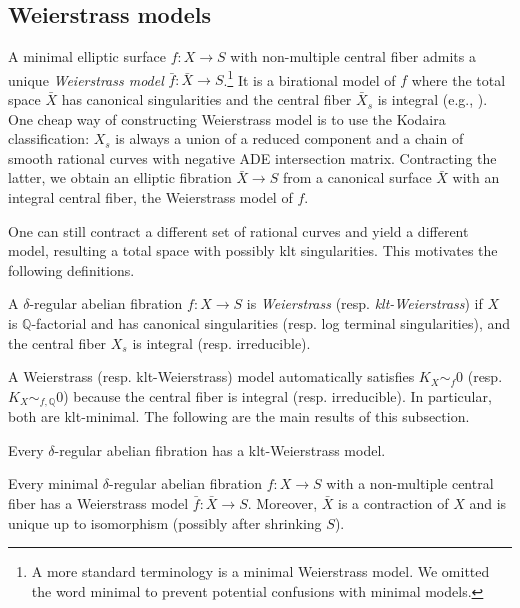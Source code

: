 \documentclass[reqno, letterpaper]{amsart}
\numberwithin{equation}{subsection}
\let\to\longrightarrow
\newcommand{\QQ}{\mathbb{Q}}
\begin{document}
		
		
	\subsection{Weierstrass models} \label{sec:Weierstrass models}
		A minimal elliptic surface $f : X \to S$ with non-multiple central fiber admits a unique \emph{Weierstrass model} $\bar f : \bar X \to S$.\footnote{A more standard terminology is a minimal Weierstrass model. We omitted the word minimal to prevent potential confusions with minimal models.} It is a birational model of $f$ where the total space $\bar X$ has canonical singularities and the central fiber $\bar X_s$ is integral (e.g., \cite[\S 1]{artin-swi73}). One cheap way of constructing Weierstrass model is to use the Kodaira classification: $X_s$ is always a union of a reduced component and a chain of smooth rational curves with negative ADE intersection matrix. Contracting the latter, we obtain an elliptic fibration $\bar X \to S$ from a canonical surface $\bar X$ with an integral central fiber, the Weierstrass model of $f$.
		
		One can still contract a different set of rational curves and yield a different model, resulting a total space with possibly klt singularities. This motivates the following definitions.
		
		\begin{definition}
			A $\delta$-regular abelian fibration $f : X \to S$ is \emph{Weierstrass} (resp. \emph{klt-Weierstrass}) if $X$ is $\QQ$-factorial and has canonical singularities (resp. log terminal singularities), and the central fiber $X_s$ is integral (resp. irreducible).
		\end{definition}
		
		A Weierstrass (resp. klt-Weierstrass) model automatically satisfies $K_X \sim_f 0$ (resp. $K_X \sim_{f, \QQ} 0$) because the central fiber is integral (resp. irreducible). In particular, both are klt-minimal. The following are the main results of this subsection.
		
		\begin{proposition} \label{prop:klt Weierstrass model}
			Every $\delta$-regular abelian fibration has a klt-Weierstrass model.
		\end{proposition}
		
		\begin{proposition} \label{prop:Weierstrass model}
			Every minimal $\delta$-regular abelian fibration $f : X \to S$ with a non-multiple central fiber has a Weierstrass model $\bar f : \bar X \to S$. Moreover, $\bar X$ is a contraction of $X$ and is unique up to isomorphism (possibly after shrinking $S$).
		\end{proposition}
		
\end{document}
